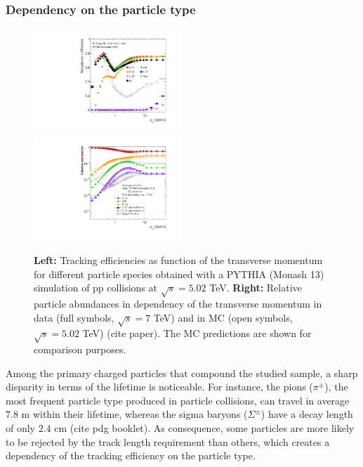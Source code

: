 \documentclass[12pt,a4paper]{report}
\begin{document}
\subsubsection{Dependency on the particle type}
\begin{figure}[tb!]
\centering
\includegraphics[width=0.495\textwidth]{Plots/5TeVMonash13_TrkEff_without-91972.pdf}  
\includegraphics[width=0.495\textwidth]{Plots/5TeVMonash13_Abundances-91973.pdf}  
\caption{\textbf{Left: }Tracking efficiencies as function of the transverse momentum for different particle species obtained with a PYTHIA (Monash 13) simulation of pp collisions at $\sqrt{s} = 5.02$ TeV. \textbf{Right:} Relative particle abundances in dependency of the transverse momentum in data (full symbols,  $\sqrt{s} = 7$ TeV) and in MC (open symbols,  $\sqrt{s} = 5.02$ TeV) (cite paper). The MC predictions are shown for comparison purposes.}
\label{trckEffParticles}
\end{figure}
Among the primary charged particles that compound the studied sample, a sharp disparity in terms of the lifetime is noticeable. For instance, the pions ($\pi^{\pm}$), the most frequent particle type produced in particle collisions, can travel in average $7.8\text{ m}$ within their lifetime, whereas the sigma baryons ($\Sigma^{\pm}$) have a decay length of only $2.4\text{ cm}$  (cite pdg booklet). As consequence, some particles are more likely to be rejected by the track length requirement than others, which creates a dependency of the tracking efficiency on the particle type. \\
\end{document}
